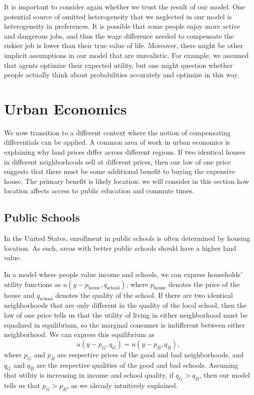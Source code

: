 It is important to consider again whether we trust the result of our model. One potential source of omitted heterogeneity that we neglected in our model is heterogeneity in preferences. It is possible that some people enjoy more active and dangerous jobs, and thus the wage difference needed to compensate the riskier job is lower than their true value of life. Moreover, there might be other implicit assumptions in our model that are unrealistic. For example, we assumed that agents optimize their expected utility, but one might question whether people actually think about probabilities accurately and optimize in this way.

\section{Urban Economics}

We now transition to a different context where the notion of compensating differentials can be applied. A common area of work in urban economics is explaining why land prices differ across different regions. If two identical houses in different neighborhoods sell at different prices, then our law of one price suggests that there must be some additional benefit to buying the expensive house. The primary benefit is likely location: we will consider in this section how location affects access to public education and commute times.

\subsection*{Public Schools} 
In the United States, enrollment in public schools is often determined by housing location. As such, areas with better public schools should have a higher land value. 

In a model where people value income and schools, we can express households' utility functions as $u(y-p_{\text{house}}, q_{\text{school}})$, where $p_{\text{house}}$ denotes the price of the house and $q_{\text{school}}$ denotes the quality of the school. If there are two identical neighborhoods that are only different in the quality of the local school, then the law of one price tells us that the utility of living in either neighborhood must be equalized in equilibrium, so the marginal consumer is indifferent between either neighborhood. We can express this equilibrium as 
$$u(y - p_G, q_G) = u(y-p_B, q_B),$$
where $p_G$ and $p_B$ are respective prices of the good and bad neighborhoods, and $q_G$ and $q_B$ are the respective qualities of the good and bad schools. Assuming that utility is increasing in income and school quality, if $q_G > q_B$, then our model tells us that $p_G > p_B$, as we already intuitively explained.

